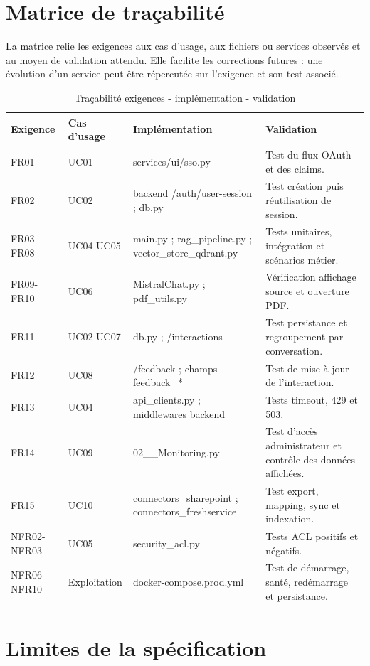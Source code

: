 \section{Matrice de traçabilité}

La matrice relie les exigences aux cas d'usage, aux fichiers ou services observés et au moyen de validation attendu. Elle facilite les corrections futures : une évolution d'un service peut être répercutée sur l'exigence et son test associé.

\begin{table}[H]
\centering
\caption{Traçabilité exigences - implémentation - validation}
\label{tab:trace_ch4}
\begin{tabular}{p{2.2cm}p{2.4cm}p{5cm}p{4.3cm}}
\toprule
\textbf{Exigence} & \textbf{Cas d'usage} & \textbf{Implémentation} & \textbf{Validation} \\
\midrule
FR01 & UC01 & services/ui/sso.py & Test du flux OAuth et des claims. \\
FR02 & UC02 & backend /auth/user-session ; db.py & Test création puis réutilisation de session. \\
FR03-FR08 & UC04-UC05 & main.py ; rag\_pipeline.py ; vector\_store\_qdrant.py & Tests unitaires, intégration et scénarios métier. \\
FR09-FR10 & UC06 & MistralChat.py ; pdf\_utils.py & Vérification affichage source et ouverture PDF. \\
FR11 & UC02-UC07 & db.py ; /interactions & Test persistance et regroupement par conversation. \\
FR12 & UC08 & /feedback ; champs feedback\_* & Test de mise à jour de l'interaction. \\
FR13 & UC04 & api\_clients.py ; middlewares backend & Tests timeout, 429 et 503. \\
FR14 & UC09 & 02\_\_Monitoring.py & Test d'accès administrateur et contrôle des données affichées. \\
FR15 & UC10 & connectors\_sharepoint ; connectors\_freshservice & Test export, mapping, sync et indexation. \\
NFR02-NFR03 & UC05 & security\_acl.py & Tests ACL positifs et négatifs. \\
NFR06-NFR10 & Exploitation & docker-compose.prod.yml & Test de démarrage, santé, redémarrage et persistance. \\
\bottomrule
\end{tabular}
\end{table}

\section{Limites de la spécification}

